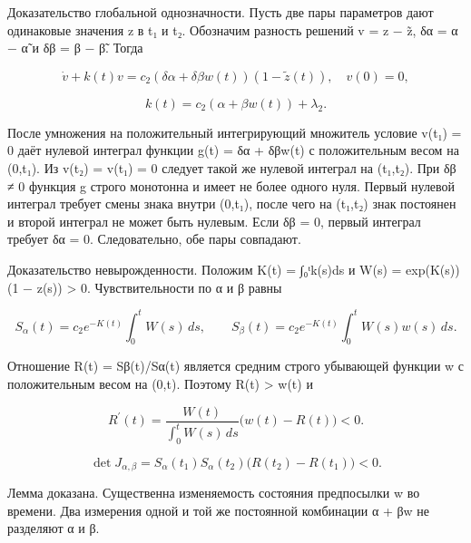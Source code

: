 \documentclass[11pt,a4paper]{article}
\begin{document}
Доказательство глобальной однозначности. Пусть две пары параметров дают одинаковые значения z в t₁ и t₂. Обозначим разность решений v = z − z̃, δα = α − α̃ и δβ = β − β̃. Тогда\par

\begin{equation}\dot v+k(t)v=c_2(\delta\alpha+\delta\beta w(t))(1-\widetilde z(t)),\quad v(0)=0,\end{equation}

\begin{equation}k(t)=c_2(\alpha+\beta w(t))+\lambda_2.\end{equation}

После умножения на положительный интегрирующий множитель условие v(t₁) = 0 даёт нулевой интеграл функции g(t) = δα + δβw(t) с положительным весом на (0,t₁). Из v(t₂) = v(t₁) = 0 следует такой же нулевой интеграл на (t₁,t₂). При δβ ≠ 0 функция g строго монотонна и имеет не более одного нуля. Первый нулевой интеграл требует смены знака внутри (0,t₁), после чего на (t₁,t₂) знак постоянен и второй интеграл не может быть нулевым. Если δβ = 0, первый интеграл требует δα = 0. Следовательно, обе пары совпадают.\par

Доказательство невырожденности. Положим K(t) = ∫₀ᵗk(s)ds и W(s) = exp(K(s))(1 − z(s)) > 0. Чувствительности по α и β равны\par

\begin{equation}S_\alpha(t)=c_2e^{-K(t)}\int_0^t W(s)\,ds,\qquad S_\beta(t)=c_2e^{-K(t)}\int_0^t W(s)w(s)\,ds.\end{equation}

Отношение R(t) = Sβ(t)/Sα(t) является средним строго убывающей функции w с положительным весом на (0,t). Поэтому R(t) > w(t) и\par

\begin{equation}R^{\prime}(t)=\frac{W(t)}{\int_0^t W(s)\,ds}\bigl(w(t)-R(t)\bigr)<0.\end{equation}

\begin{equation}\det J_{\alpha,\beta}=S_\alpha(t_1)S_\alpha(t_2)\bigl(R(t_2)-R(t_1)\bigr)<0.\end{equation}

Лемма доказана. Существенна изменяемость состояния предпосылки w во времени. Два измерения одной и той же постоянной комбинации α + βw не разделяют α и β.\par
\end{document}
